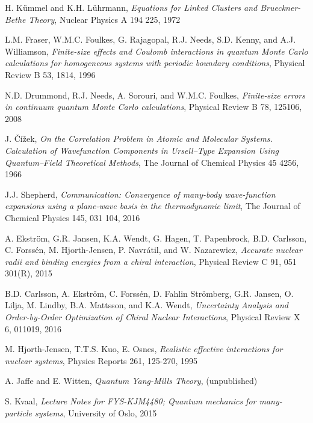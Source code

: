 \documentclass[10pt,twoside]{report}
\begin{document}
\begin{thebibliography}{9}
		H. K\"ummel and K.H. L\"uhrmann, \emph{Equations for Linked Clusters and Brueckner-Bethe Theory}, Nuclear Physics A 194 225, 1972
		
		L.M. Fraser, W.M.C. Foulkes, G. Rajagopal, R.J. Needs, S.D. Kenny, and A.J. Williamson,
		\emph{Finite-size effects and Coulomb interactions in quantum Monte Carlo calculations
			for homogeneous systems with periodic boundary conditions}, Physical Review B 53, 1814, 1996
		
		N.D. Drummond, R.J. Needs, A. Sorouri, and W.M.C. Foulkes, \emph{Finite-size errors in continuum quantum Monte Carlo calculations}, Physical Review B 78, 125106, 2008
		
		J. \v{C}\'{i}\v{z}ek, \emph{On the Correlation Problem in Atomic and Molecular Systems. Calculation of Wavefunction Components in Ursell--Type Expansion Using Quantum--Field Theoretical Methods}, The Journal of Chemical Physics 45 4256, 1966
		
		J.J. Shepherd, \emph{Communication: Convergence of many-body wave-function expansions
			using a plane-wave basis in the thermodynamic limit}, The Journal of Chemical Physics 145, 031 104, 2016
		
		A. Ekstr\"om, G.R. Jansen, K.A. Wendt, G. Hagen, T. Papenbrock, B.D. Carlsson, C. Forss\'{e}n,
		M. Hjorth-Jensen, P. Navr\'{a}til, and W. Nazarewicz, \emph{Accurate nuclear radii and binding energies from a chiral interaction}, Physical Review C 91, 051 301(R), 2015
		
		B.D. Carlsson, A. Ekstr\"om, C. Forss\'{e}n, D. Fahlin Str\"omberg, G.R. Jansen, O. Lilja, M. Lindby, B.A. Mattsson, and K.A. Wendt, \emph{Uncertainty Analysis and Order-by-Order Optimization of Chiral Nuclear Interactions}, Physical Review X 6, 011019, 2016
		
		M. Hjorth-Jensen, T.T.S. Kuo, E. Osnes, \emph{Realistic effective interactions for nuclear systems}, Physics Reports 261, 125-270, 1995
		
		A. Jaffe and E. Witten, \emph{Quantum Yang-Mills Theory}, (unpublished)
		
		S. Kvaal, \emph{Lecture Notes for FYS-KJM4480; Quantum mechanics for many-particle systems}, University of Oslo, 2015
		

\end{thebibliography}
\end{document}

